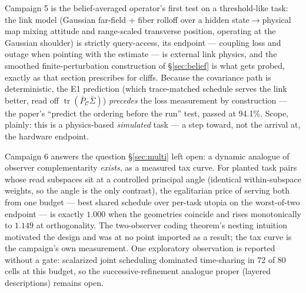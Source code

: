 \documentclass[letterpaper,onecolumn]{IEEEtran}
\theoremstyle{definition}
\theoremstyle{remark}
\newcommand{\PCb}{\bar P_{\mathcal{C}}}
\newcommand{\tr}{\operatorname{tr}}
\newcommand{\Sig}{\Sigma}
\begin{document}
Campaign 5 is the belief-averaged operator's first test on a
threshold-like task: the link model (Gaussian far-field + fiber
rolloff over a hidden state$\to$physical map mixing attitude and
range-scaled transverse position, operating at the Gaussian shoulder) is
strictly query-access, its endpoint --- coupling loss and outage when
pointing with the estimate --- is external link physics, and the smoothed
finite-perturbation construction of \S\ref{sec:belief} is what gets
probed, exactly as that section prescribes for cliffs. Because the
covariance path is deterministic, the E1 prediction (which trace-matched
schedule serves the link better, read off $\tr(\PCb\bar\Sig)$)
\emph{precedes} the loss measurement by construction --- the paper's
``predict the ordering before the run'' test, passed at 94.1\%. Scope,
plainly: this is a physics-based \emph{simulated} task --- a step
toward, not the arrival at, the hardware endpoint.

Campaign 6 answers the question \S\ref{sec:multi} left open: a dynamic
analogue of observer complementarity \emph{exists}, as a measured tax
curve. For planted task pairs whose read subspaces sit at a controlled
principal angle (identical within-subspace weights, so the angle is the
only contrast), the egalitarian price of serving both from one budget ---
best shared schedule over per-task utopia on the worst-of-two
endpoint --- is exactly $1.000$ when the geometries coincide and rises
monotonically to $1.149$ at orthogonality. The two-observer coding
theorem's nesting intuition motivated the design and was at no point
imported as a result; the tax curve is the campaign's own measurement.
One exploratory observation is reported without a gate: scalarized joint
scheduling dominated time-sharing in 72 of 80 cells at this budget, so the
successive-refinement analogue proper (layered descriptions) remains open.
\end{document}
